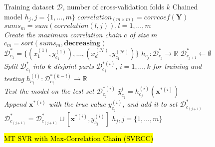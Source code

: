 \documentclass[preprint,12pt]{elsarticle}
\begin{document}
\begin{figure}[tpb]
\begin{algorithm}[H]
\caption{\hl{MT SVR with Max-Correlation Chain (SVRCC)}}
\small
\label{alg:SVRCC} 
\begin{algorithmic}[1]
\renewcommand{\algorithmicrequire}{\textbf{Input:}}
\renewcommand{\algorithmicensure}{\textbf{Output:}}
\REQUIRE Training dataset $\mathcal{D}$, number of cross-validation folds $k$
\ENSURE  Chained model $h_j, j = \{1,\ldots,m\}$
\STATE $correlation_{\left(m \times m\right)} = corrcoef(\bm Y)$
\STATE $sums_m = sum\left(correlation\left(l,j\right)\right), l=1,\ldots,m$
\\ \textit{Create the maximum correlation chain $c$ of size $m$}
\STATE $c_m = sort\left(sums_m,\textbf{decreasing}\right)$
\STATE $\mathcal{D}_{c_1}^* = \{(x_1^{(1)},y_{c_1}^{(1)}),\ldots,(x_d^{(\mathcal N)},y_{c_1}^{(\mathcal N)})\}$
\STATE $h_{c_j} : \mathcal{D}_{c_j}^* \rightarrow \mathbb{R}$
\STATE $\mathcal{D}_{c_{j+1}}^* \leftarrow \emptyset$
\\ \textit{Split $\mathcal{D}_{c_j}^*$ into $k$ disjoint parts $\mathcal{D}_{c_j}^{*(i)}, \, i=1,\ldots,k$ for training and testing}
\STATE $h_{c_j}^{(i)} : \mathcal{D}_{c_j}^{*(k-i)} \rightarrow \mathbb{R}$
\\ \textit{Test the model on the test set $\mathcal{D}_{c_j}^{*(i)}$}
\STATE $\hat{y}_{c_j}^i = h_{c_j}^{(i)}(\bm x^{*(i)})$
\\ \textit{Append $\bm x^{*(i)}$ with the true value $y_{c_j}^{(i)}$, and add it to set $\mathcal{D}_{c_{(j+1)}}^*$}
\STATE $\mathcal{D}_{c_{(j+1)}}^* = \mathcal{D}_{c_{(j+1)}}^* \cup [\bm x^{*(i)},y_{c_j}^{(i)}]$
\ENDFOR
\ENDFOR
\ENDIF
\ENDFOR
\RETURN $h_j, j = \{1,\ldots,m\}$
\end{algorithmic} 
\end{algorithm}
\end{figure}
\end{document}
